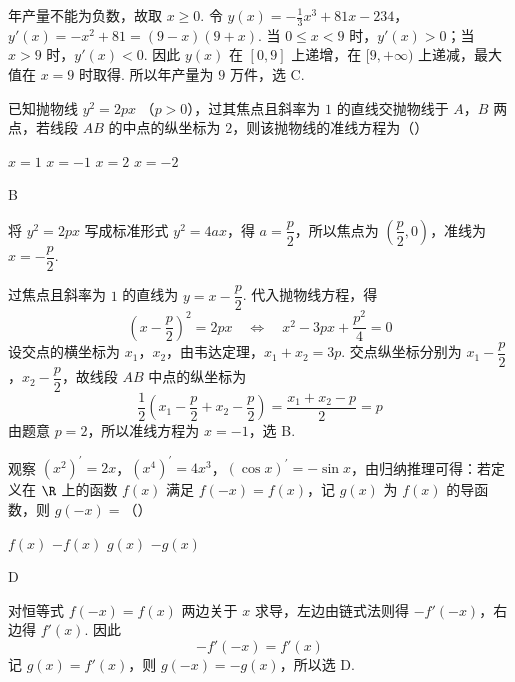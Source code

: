 \begin{solution}
年产量不能为负数，故取 \(x\geqslant0\). 令
\(y(x)=-\frac{1}{3}x^3+81x-234\)，\(y'(x)=-x^2+81=(9-x)(9+x)\).
当 \(0\leqslant x<9\) 时，\(y'(x)>0\)；当 \(x>9\) 时，\(y'(x)<0\). 因此 \(y(x)\) 在 \([0,9]\) 上递增，在 \([9,+\infty)\) 上递减，最大值在 \(x=9\) 时取得. 所以年产量为 \(9\) 万件，选 C.
\end{solution}

\begin{problem}
已知抛物线 \(y^{2} = 2px\) （\(p > 0\)），过其焦点且斜率为 \(1\) 的直线交抛物线于 \(A\)，\(B\) 两点，若线段 \(AB\) 的中点的纵坐标为 \(2\)，则该抛物线的准线方程为（\quad）

\choices
    {\(x = 1\)}
    {\(x = -1\)}
    {\(x = 2\)}
    {\(x = -2\)}
\end{problem}

\begin{answer}
B
\end{answer}

\begin{solution}
将 \(y^2=2px\) 写成标准形式 \(y^2=4ax\)，得 \(a=\dfrac p2\)，所以焦点为 \(\left(\dfrac p2,0\right)\)，准线为 \(x=-\dfrac p2\).

过焦点且斜率为 \(1\) 的直线为 \(y=x-\dfrac p2\). 代入抛物线方程，得
\[
\left(x-\frac p2\right)^2=2px
\quad\Longleftrightarrow\quad
x^2-3px+\frac{p^2}{4}=0
\]
设交点的横坐标为 \(x_1\)，\(x_2\)，由韦达定理，\(x_1+x_2=3p\). 交点纵坐标分别为 \(x_1-\dfrac p2\)，\(x_2-\dfrac p2\)，故线段 \(AB\) 中点的纵坐标为
\[
\frac{1}{2}\left(x_1-\frac p2+x_2-\frac p2\right)=\frac{x_1+x_2-p}{2}=p
\]
由题意 \(p=2\)，所以准线方程为 \(x=-1\)，选 B.
\end{solution}

\begin{problem}
观察 \((x^{2})^{\prime} = 2x\)，\((x^{4})^{\prime} = 4x^{3}\)，\((\cos x)^{\prime} = -\sin x\)，由归纳推理可得：若定义在 \(\R\) 上的函数 \(f(x)\) 满足 \(f(-x) = f(x)\)，记 \(g(x)\) 为 \(f(x)\) 的导函数，则 \(g(-x) =\)（\quad）

\choices
    {\(f(x)\)}
    {\(-f(x)\)}
    {\(g(x)\)}
    {\(-g(x)\)}
\end{problem}

\begin{answer}
D
\end{answer}

\begin{solution}
对恒等式 \(f(-x)=f(x)\) 两边关于 \(x\) 求导，左边由链式法则得 \(-f'(-x)\)，右边得 \(f'(x)\). 因此
\[
-f'(-x)=f'(x)
\]
记 \(g(x)=f'(x)\)，则 \(g(-x)=-g(x)\)，所以选 D.
\end{solution}

